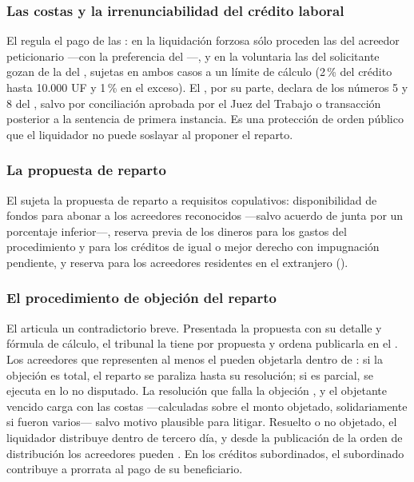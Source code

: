 \subsubsection{Las costas y la irrenunciabilidad del crédito laboral}

El  regula el pago de las : en la liquidación forzosa sólo
proceden las del acreedor peticionario ---con la preferencia del  ---, y en la
voluntaria las del solicitante gozan de la del , sujetas en ambos casos a un límite de
cálculo (2\,\% del crédito hasta 10.000 UF y 1\,\% en el exceso). El , por su parte,
declara  de los
números 5 y 8 del , salvo por conciliación aprobada por el Juez del Trabajo o
transacción posterior a la sentencia de primera instancia. Es una protección de orden público que
el liquidador no puede soslayar al proponer el reparto.

\subsubsection{La propuesta de reparto}

El  sujeta la propuesta de reparto a requisitos copulativos: disponibilidad de fondos
para abonar a los acreedores reconocidos  ---salvo
acuerdo de junta por un porcentaje inferior---, reserva previa de los dineros para los gastos del
procedimiento y para los créditos de igual o mejor derecho con impugnación pendiente, y reserva
para los acreedores residentes en el extranjero ().

\subsubsection{El procedimiento de objeción del reparto}

El  articula un contradictorio breve. Presentada la propuesta con su detalle y fórmula de
cálculo, el tribunal la tiene por propuesta y ordena publicarla en el \boletin{}. Los acreedores
que representen al menos el  pueden objetarla dentro
de : si la objeción es total, el reparto se paraliza hasta su resolución; si es
parcial, se ejecuta en lo no disputado. La resolución que falla la objeción , y el objetante vencido carga con las costas ---calculadas sobre el monto objetado,
solidariamente si fueron varios--- salvo motivo plausible para litigar. Resuelto o no objetado, el
liquidador distribuye dentro de tercero día, y desde la publicación de la orden de distribución los
acreedores pueden . En los créditos subordinados, el subordinado
contribuye a prorrata al pago de su beneficiario.

